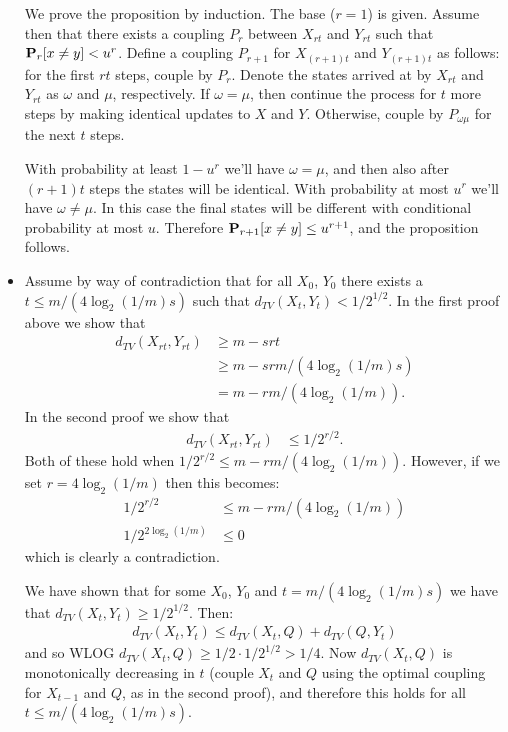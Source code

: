 \documentclass[11pt]{article} \usepackage{amssymb}
\begin{document}
\begin{itemize}
  We prove the proposition by induction. The base ($r=1$) is given. Assume then
  that there exists a coupling $P_r$ 
  between $X_{rt}$ and $Y_{rt}$ such that $\P_r[x\neq y] < u^r$.
  Define a coupling $P_{r+1}$ for  $X_{(r+1)t}$ and $Y_{(r+1)t}$ as follows: for the
  first $rt$ steps, couple by $P_r$. Denote the states arrived at by $X_{rt}$ and
  $Y_{rt}$ as $\omega$ and $\mu$, respectively. If $\omega=\mu$, then
  continue the process for $t$ more steps by making identical updates to $X$
  and $Y$. Otherwise, 
  couple by $P_{\omega\mu}$ for the next $t$ steps.

  With probability at least $1-u^r$ we'll have $\omega=\mu$, and then also 
  after $(r+1)t$ steps the states will be identical.
  With probability at most $u^r$ we'll have $\omega\neq\mu$. In this case the final states
  will be different with conditional probability at most $u$. Therefore
  $\P_{r+1}[x\neq y]\leq u^{r+1}$, and the proposition follows.

\item Assume by way of contradiction that for all $X_0$, $Y_0$ there exists a
  $t\leq m/(4\log_2(1/m)s)$ such that $d_{TV}(X_t,Y_t)<1/2^{1/2}$. In the
  first proof above we show that 
  \begin{align*}
    d_{TV}(X_{rt},Y_{rt}) &\geq  m-srt
    \\ &\geq m-srm/(4\log_2(1/m)s)
    \\ &= m-rm/(4\log_2(1/m)).
  \end{align*}
  In the second proof we show that
  \begin{align*}
    d_{TV}(X_{rt},Y_{rt}) &\leq  1/2^{r/2}.
  \end{align*}
  Both of these hold when $1/2^{r/2} \leq m-rm/(4\log_2(1/m))$. However, if we set
  $r=4\log_2(1/m)$ then this becomes:
  \begin{align*}
    1/2^{r/2} &\leq m-rm/(4\log_2(1/m))
    \\ 1/2^{2\log_2(1/m)} &\leq 0
  \end{align*}
  which is clearly a contradiction.

  We have shown that for some $X_0$, $Y_0$ and $t = m/(4\log_2(1/m)s)$ we
  have that $d_{TV}(X_t,Y_t) \geq 1/2^{1/2}$. Then:
  \begin{align*}
    d_{TV}(X_t,Y_t) \leq d_{TV}(X_t,Q) + d_{TV}(Q,Y_t)
  \end{align*}
  and so WLOG $d_{TV}(X_t,Q) \geq 1/2\cdot 1/2^{1/2}>1/4$. Now $d_{TV}(X_t,Q)$ is monotonically
  decreasing in $t$ (couple $X_t$ and $Q$ using the optimal coupling for $X_{t-1}$
  and $Q$, as in the second proof), and therefore
  this holds for all  $t \leq m/(4\log_2(1/m)s)$.
\end{itemize}
\end{document}
